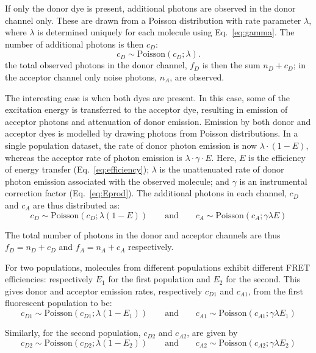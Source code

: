 If only the donor dye is present, additional photons are observed in the donor channel only. These are drawn from a Poisson distribution with rate parameter $\lambda$, where $\lambda$ is determined uniquely for each molecule using Eq.~\ref{eq:gamma}. The number of additional photons is then $c_D$:
\begin{equation}
c_D \sim \text{Poisson}(c_{D}; \lambda). 
\end{equation}
the total observed photons in the donor channel, $f_D$ is then the sum $n_D + c_D$; in the acceptor channel only noise photons, $n_A$, are observed.

The interesting case is when both dyes are present.  In this case, some of the excitation energy is transferred to the acceptor dye, resulting in emission of acceptor photons and attenuation of donor emission.  Emission by both donor and acceptor dyes is modelled by drawing photons from Poisson distributions. In a single population dataset, the rate of donor photon emission is now $\lambda\cdot(1-E)$, whereas the acceptor rate of photon emission is $\lambda \cdot \gamma \cdot E$. Here, $E$ is the efficiency of energy transfer (Eq.~\ref{eq:efficiency}); $\lambda$ is the unattenuated rate of donor photon emission associated with the observed molecule; and $\gamma$ is an instrumental correction factor (Eq.~\ref{eq:Eprod}). The additional photons in each channel, $c_D$ and $c_A$ are thus distributed as:
\begin{equation}
c_D \sim \text{Poisson}(c_D; \lambda (1-E)) \qquad \text{and} \qquad c_A \sim \text{Poisson}(c_A; \gamma \lambda E)
\end{equation}

The total number of photons in the donor and acceptor channels are thus $f_D = n_D + c_D$ and $f_A = n_A + c_A$ respectively.   

For two populations, molecules from different populations exhibit different FRET efficiencies: respectively $E_1$ for the first population and $E_2$ for the second. This gives donor and acceptor emission rates, respectively $c_{D1}$ and $c_{A1}$, from the first fluorescent population to be:
\begin{equation}
 c_{D1} \sim \text{Poisson}(c_{D1}; \lambda(1-E_1)) \qquad \text{and} \qquad c_{A1} \sim \text{Poisson}(c_{A1}; \gamma \lambda E_1) 
\end{equation}

Similarly, for the second population, $c_{D2}$ and $c_{A2}$, are given by
\begin{equation}
 c_{D2} \sim \text{Poisson}(c_{D2}; \lambda(1-E_2)) \qquad \text{and} \qquad c_{A2} \sim \text{Poisson}(c_{A2}; \gamma \lambda E_2) 
\end{equation}

